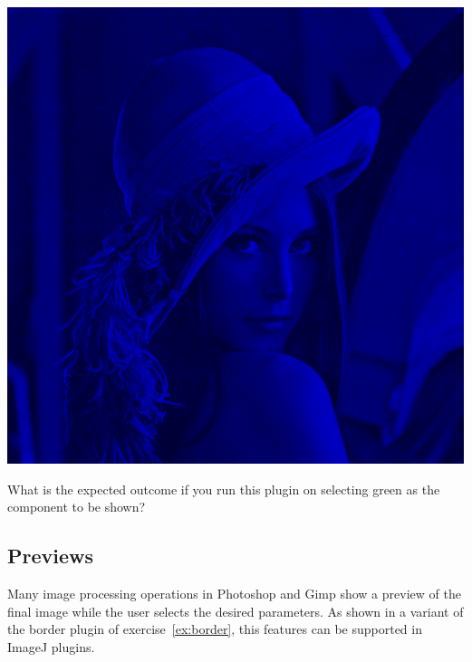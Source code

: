 \documentclass{book}
\begin{document}
\begin{exercise}
\begin{center}
\includegraphics[scale=0.2]{lena-onlyblue.png}
\end{center}
What is the expected outcome if you run this plugin on  selecting green as the component to be shown?
\end{exercise}

\subsection*{Previews}
Many image processing operations in Photoshop and Gimp show a preview of the final image while the user selects the desired parameters. As shown in a variant of the border plugin of exercise~\ref{ex:border}, this features can be supported in ImageJ plugins.
\end{document}
